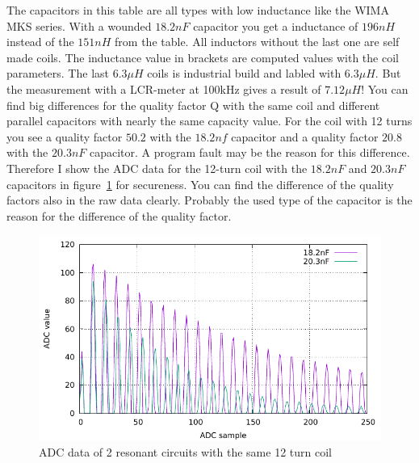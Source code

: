 The capacitors in this table are all types with low inductance like the
WIMA MKS series. With a wounded \(18.2nF\) capacitor you get a inductance of
\(196nH\) instead of the \(151nH\) from the table.
All inductors without the last one are self made coils.
The inductance value in brackets are computed values with the coil parameters.
The last \(6.3\mu H\) coils is industrial build and labled with \(6.3\mu H\).
But the measurement with a LCR-meter at 100kHz gives a result of \(7.12\mu H\)!
You can find big differences for the quality factor Q with the same coil and
different parallel capacitors with nearly the same capacity value. 
For the coil with 12 turns you see a quality factor \(50.2\) with the \(18.2nf\)
capacitor and a quality factor \(20.8\) with the \(20.3nF\) capacitor.
A program fault may be the reason for this difference.
Therefore I show the ADC data for the 12-turn coil with the \(18.2nF\) and \(20.3nF\)
capacitors in figure~\ref{fig:W12compare} for secureness.
You can find the difference of the quality factors also in the raw data clearly.
Probably the used type of the capacitor is the reason for the difference of
the quality factor.

\begin{figure}[H]
\centering
\includegraphics[width=16cm]{../GNU/W12compare.pdf}
\caption{ADC data of 2 resonant circuits with the same 12 turn coil}
\label{fig:W12compare}
\end{figure}

